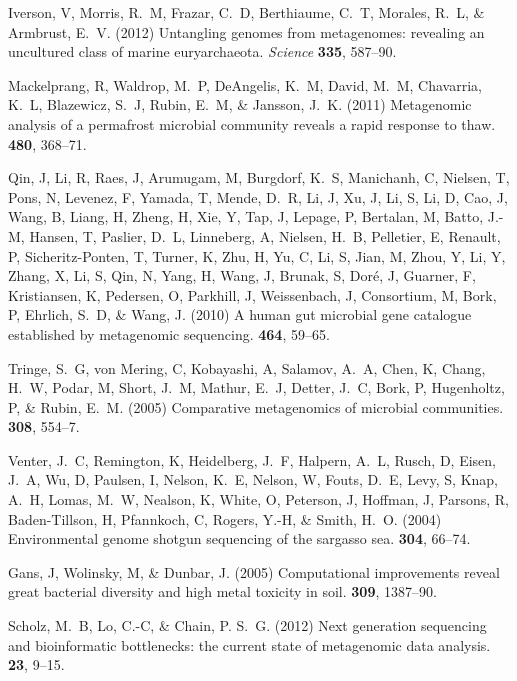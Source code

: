 \documentclass{pnastwo}
\begin{document}
\begin{article}
\begin{thebibliography}{10}
 Iverson, V, Morris, R.~M, Frazar, C.~D, Berthiaume,
C.~T, Morales, R.~L, \& Armbrust, E.~V. \newblock (2012) Untangling genomes from
metagenomes: revealing an uncultured class of marine euryarchaeota. \newblock
{\em Science} {\bf 335}, 587--90.

 Mackelprang, R, Waldrop, M.~P, DeAngelis, K.~M,
David, M.~M, Chavarria, K.~L, Blazewicz, S.~J, Rubin, E.~M, \& Jansson, J.~K.
\newblock (2011) Metagenomic analysis of a permafrost microbial community
reveals a rapid response to thaw.  {\bf 480}, 368--71.

 Qin, J, Li, R, Raes, J, Arumugam, M, Burgdorf, K.~S,
Manichanh, C, Nielsen, T, Pons, N, Levenez, F, Yamada, T, Mende, D.~R, Li, J,
Xu, J, Li, S, Li, D, Cao, J, Wang, B, Liang, H, Zheng, H, Xie, Y, Tap, J,
Lepage, P, Bertalan, M, Batto, J.-M, Hansen, T, Paslier, D.~L, Linneberg, A,
Nielsen, H.~B, Pelletier, E, Renault, P, Sicheritz-Ponten, T, Turner, K, Zhu, H,
Yu, C, Li, S, Jian, M, Zhou, Y, Li, Y, Zhang, X, Li, S, Qin, N, Yang, H, Wang,
J, Brunak, S, Dor{\'e}, J, Guarner, F, Kristiansen, K, Pedersen, O, Parkhill, J,
Weissenbach, J, Consortium, M, Bork, P, Ehrlich, S.~D, \& Wang, J. \newblock
(2010) A human gut microbial gene catalogue established by metagenomic
sequencing.  {\bf 464}, 59--65.

 Tringe, S.~G, von Mering, C, Kobayashi, A, Salamov,
A.~A, Chen, K, Chang, H.~W, Podar, M, Short, J.~M, Mathur, E.~J, Detter, J.~C,
Bork, P, Hugenholtz, P, \& Rubin, E.~M. \newblock (2005) Comparative
metagenomics of microbial communities.  {\bf 308},
554--7.

 Venter, J.~C, Remington, K, Heidelberg, J.~F, Halpern,
A.~L, Rusch, D, Eisen, J.~A, Wu, D, Paulsen, I, Nelson, K.~E, Nelson, W, Fouts,
D.~E, Levy, S, Knap, A.~H, Lomas, M.~W, Nealson, K, White, O, Peterson, J,
Hoffman, J, Parsons, R, Baden-Tillson, H, Pfannkoch, C, Rogers, Y.-H, \& Smith,
H.~O. \newblock (2004) Environmental genome shotgun sequencing of the sargasso
sea.  {\bf 304}, 66--74.

 Gans, J, Wolinsky, M, \& Dunbar, J. \newblock (2005)
Computational improvements reveal great bacterial diversity and high metal
toxicity in soil.  {\bf 309}, 1387--90.

 Scholz, M.~B, Lo, C.-C, \& Chain, P. S.~G. \newblock
(2012) Next generation sequencing and bioinformatic bottlenecks: the current
state of metagenomic data analysis.  {\bf 23}, 9--15.


\end{thebibliography}
\end{article}
\end{document}
